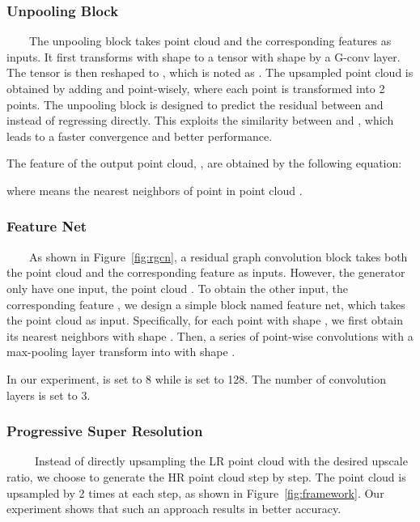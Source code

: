 \documentclass[10pt,twocolumn,letterpaper]{article}
\begin{document}
\subsubsection{Unpooling Block}
~~~~The unpooling block takes point cloud  and the corresponding features  as inputs.
It first transforms  with shape  to a tensor with shape  by a G-conv layer.
The tensor is then reshaped to , which is noted as .
The upsampled point cloud  is obtained by adding  and  point-wisely, where each point is transformed into 2 points.
The unpooling block is designed to predict the residual between  and  instead of regressing  directly.
This exploits the similarity between  and , which leads to a faster convergence and better performance.

The feature of the output point cloud, , are obtained by the following equation:

where  means the  nearest neighbors of point  in point cloud .

\subsubsection{Feature Net}
~~~~As shown in Figure~\ref{fig:rgcn}, a residual graph convolution block takes both the point cloud and the corresponding feature as inputs.
However, the generator only have one input, the point cloud .
To obtain the other input, the corresponding feature , we design a simple block named feature net, which takes the point cloud  as input.
Specifically, for each point  with shape , we first obtain its  nearest neighbors  with shape .
Then, a series of point-wise convolutions with a max-pooling layer transform  into  with shape .

In our experiment,  is set to 8 while  is set to 128.
The number of convolution layers is set to 3.

\subsubsection{Progressive Super Resolution}
~~~~~Instead of directly upsampling the LR point cloud with the desired upscale ratio, we choose to generate the HR point cloud step by step.
The point cloud is upsampled by 2 times at each step, as shown in Figure~\ref{fig:framework}.
Our experiment shows that such an approach results in better accuracy.
\end{document}
